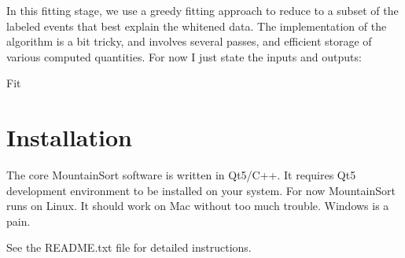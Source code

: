 \documentclass[hidelinks,10pt]{article}
\begin{document}
In this fitting stage, we use a greedy fitting approach to reduce to a subset of the labeled events that best explain the whitened data. The implementation of the algorithm is a bit tricky, and involves several passes, and efficient storage of various computed quantities. For now I just state the inputs and outputs:

\begin{algorithm}
\DontPrintSemicolon %

\caption{{\sc Fit}}
\label{algo:fit}
\end{algorithm}


\section {Installation}

The core MountainSort software is written in Qt5/C++. It requires Qt5 development environment to be installed on your system. For now MountainSort runs on Linux. It should work on Mac without too much trouble. Windows is a pain.

See the README.txt file for detailed instructions.
\end{document}
